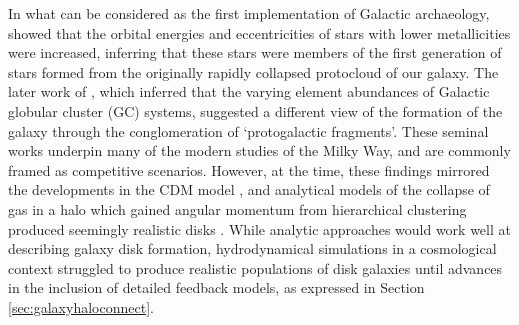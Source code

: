 In what can be considered as the first implementation of Galactic archaeology, \citet{1962ApJ...136..748E} showed that the orbital energies and eccentricities of stars with lower metallicities were increased, inferring that these stars were members of the first generation of stars formed from the originally rapidly collapsed protocloud of our galaxy. The later work of \citet{1978ApJ...225..357S}, which inferred that the varying element abundances of Galactic globular cluster (GC) systems, suggested a different view of the formation of the galaxy through the conglomeration of `protogalactic fragments'. These seminal works underpin many of the modern studies of the Milky Way, and are commonly framed as competitive scenarios. However, at the time, these findings mirrored the developments in the CDM model \citep{1978MNRAS.183..341W}, and analytical models of the collapse of gas in a halo which gained angular momentum from hierarchical clustering produced seemingly realistic disks \citep{1980MNRAS.193..189F}. While analytic approaches would work well at describing galaxy disk formation, hydrodynamical simulations in a cosmological context struggled to produce realistic populations of disk galaxies until advances in the inclusion of detailed feedback models, as expressed in Section \ref{sec:galaxyhaloconnect}. 



